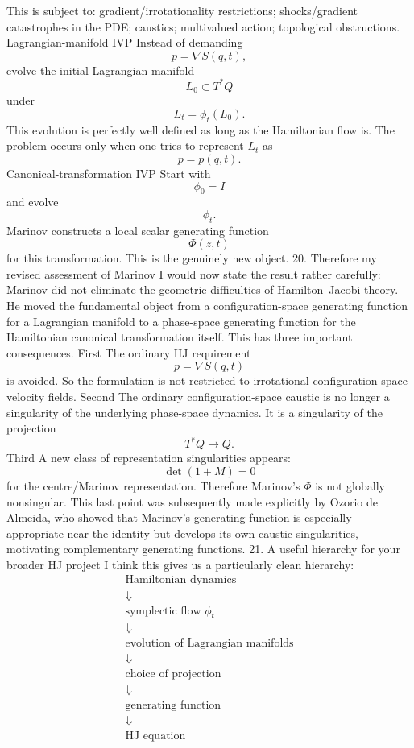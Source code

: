 This is subject to:
gradient/irrotationality restrictions;
shocks/gradient catastrophes in the PDE;
caustics;
multivalued action;
topological obstructions.
Lagrangian-manifold IVP
Instead of demanding
$$ p=\nabla S(q,t), $$
evolve the initial Lagrangian manifold
$$ L_0\subset T^*Q $$
under
$$ L_t=\phi_t(L_0). $$
This evolution is perfectly well defined as long as the Hamiltonian flow is.
The problem occurs only when one tries to represent \(L_t\) as
$$ p=p(q,t). $$
Canonical-transformation IVP
Start with
$$ \phi_0=I $$
and evolve
$$ \phi_t. $$
Marinov constructs a local scalar generating function
$$ \Phi(z,t) $$
for this transformation.
This is the genuinely new object.
20. Therefore my revised assessment of Marinov
I would now state the result rather carefully:
Marinov did not eliminate the geometric difficulties of Hamilton–Jacobi theory. He moved the fundamental object from a configuration-space generating function for a Lagrangian manifold to a phase-space generating function for the Hamiltonian canonical transformation itself.
This has three important consequences.
First
The ordinary HJ requirement
$$ p=\nabla S(q,t) $$
is avoided.
So the formulation is not restricted to irrotational configuration-space velocity fields.
Second
The ordinary configuration-space caustic is no longer a singularity of the underlying phase-space dynamics.
It is a singularity of the projection
$$ T^*Q\rightarrow Q. $$
Third
A new class of representation singularities appears:
$$ \det(1+M)=0 $$
for the centre/Marinov representation.
Therefore Marinov's \(\Phi\) is not globally nonsingular.
This last point was subsequently made explicitly by Ozorio de Almeida, who showed that Marinov's generating function is especially appropriate near the identity but develops its own caustic singularities, motivating complementary generating functions.
21. A useful hierarchy for your broader HJ project
I think this gives us a particularly clean hierarchy:
$$ \boxed{ \begin{array}{c} \text{Hamiltonian dynamics}\\[2mm] \Downarrow\\ \text{symplectic flow }\phi_t\\[2mm] \Downarrow\\ \text{evolution of Lagrangian manifolds}\\[2mm] \Downarrow\\ \text{choice of projection}\\[2mm] \Downarrow\\ \text{generating function}\\[2mm] \Downarrow\\ \text{HJ equation} \end{array}} $$
